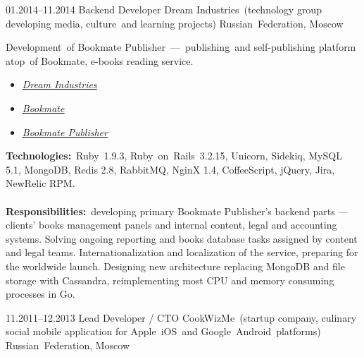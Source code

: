 \documentclass[12pt,a4paper,final]{moderncv}
\begin{document}
\cventry
{01.2014--11.2014}
{Backend Developer}
{Dream Industries~(technology group developing media, culture~and learning projects)}
{Russian~Federation, Moscow}
{}
{
  Development~of Bookmate Publisher~---~publishing~and self-publishing platform atop~of Bookmate, e-books reading service.
  \bigskip
  \begin{itemize}
    \item \underline{\href{http://dreamindustries.co/}{\itshape Dream Industries}}
    \item \underline{\href{http://bookmate.com/}{\itshape Bookmate}}
    \item \underline{\href{http://publisher.bookmate.com/}{\itshape Bookmate Publisher}}
  \end{itemize}
  \bigskip
  \textbf{Technologies:}~Ruby~1.9.3, Ruby~on~Rails~3.2.15, Unicorn, Sidekiq, MySQL 5.1, MongoDB, Redis 2.8, RabbitMQ, NginX 1.4, CoffeeScript, jQuery, Jira, NewRelic RPM.
  \\\\
  \textbf{Responsibilities:}~developing primary Bookmate Publisher's backend parts --- clients' books management panels and internal content, legal and accounting systems. Solving ongoing reporting and books database tasks assigned by content and legal teams. Internationalization and localization of the service, preparing for the worldwide launch. Designing new architecture replacing MongoDB and file storage with Cassandra, reimplementing most CPU and memory consuming processes in Go.
}
\cventry
{11.2011--12.2013}
{Lead Developer / CTO}
{CookWizMe~(startup company, culinary social mobile application for Apple~iOS~and Google~Android~platforms)}
{Russian~Federation, Moscow}
{}
\end{document}
